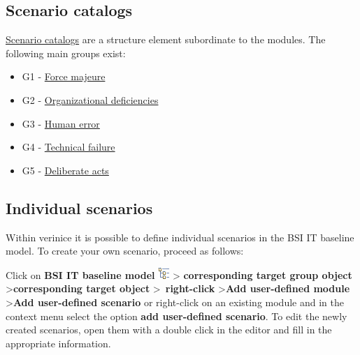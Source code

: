 \documentclass[a4paper,10pt]{book}
\begin{document}
\subsection{Scenario catalogs}
\href{https://www.bsi.bund.de/cln_156/DE/Themen/weitereThemen/ITGrundschutzKataloge/Inhalt/Gefaehrdungskataloge/gefaehrdungskataloge_node.html}{Scenario catalogs} are a structure element subordinate to the modules.
The following main groups exist:
\begin{itemize}
\item G1 - \href{https://www.bsi.bund.de/cln_156/DE/Themen/weitereThemen/ITGrundschutzKataloge/Inhalt/Gefaehrdungskataloge/G1HoehereGewalt/g1hoeheregewalt_node.html}{Force majeure}
\item G2 - \href{https://www.bsi.bund.de/cln_156/DE/Themen/weitereThemen/ITGrundschutzKataloge/Inhalt/Gefaehrdungskataloge/G2OrganisatorischeMaengel/g2organisatorischemaengel_node.html}{Organizational deficiencies}
\item G3 - \href{https://www.bsi.bund.de/cln_156/DE/Themen/weitereThemen/ITGrundschutzKataloge/Inhalt/Gefaehrdungskataloge/G3MenschlicheFehlhandlung/g3menschlichefehlhandlung_node.html}{Human error}
\item G4 - \href{https://www.bsi.bund.de/cln_156/DE/Themen/weitereThemen/ITGrundschutzKataloge/Inhalt/Gefaehrdungskataloge/G4TechnischesVersagen/g4technischesversagen_node.html}{Technical failure}
\item G5 - \href{https://www.bsi.bund.de/cln_156/DE/Themen/weitereThemen/ITGrundschutzKataloge/Inhalt/Gefaehrdungskataloge/G5VorsaetzlicheHandlungen/g5vorsaetzlichehandlungen_node.html}{Deliberate acts}
\end{itemize}

\subsection{Individual scenarios}\label{sec_individual_scenarios}
Within verinice it is possible to define individual scenarios in the BSI
IT baseline model. To create your own scenario, proceed as follows:

Click on \textbf{BSI IT baseline model} \includegraphics[height=2ex]{Icon/GS_Modell.png} \textgreater
\textbf{corresponding target group object} \textgreater \textbf{corresponding target object} \textgreater\ \textbf{right-click} \textgreater \textbf{Add user-defined module} \textgreater \textbf{Add user-defined scenario} or right-click on an existing module and in the context menu select the option \textbf{add user-defined scenario}.
To edit the newly created scenarios, open them with a double click in the editor and fill in the appropriate information.
\end{document}
